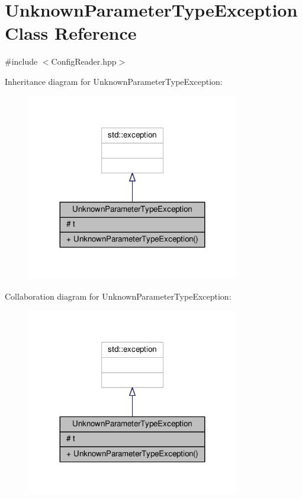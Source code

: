 \hypertarget{class_unknown_parameter_type_exception}{}\section{Unknown\+Parameter\+Type\+Exception Class Reference}
\label{class_unknown_parameter_type_exception}


{\ttfamily \#include $<$Config\+Reader.\+hpp$>$}



Inheritance diagram for Unknown\+Parameter\+Type\+Exception\+:\nopagebreak
\begin{figure}[H]
\begin{center}
\leavevmode
\includegraphics[width=263pt]{class_unknown_parameter_type_exception__inherit__graph}
\end{center}
\end{figure}


Collaboration diagram for Unknown\+Parameter\+Type\+Exception\+:\nopagebreak
\begin{figure}[H]
\begin{center}
\leavevmode
\includegraphics[width=263pt]{class_unknown_parameter_type_exception__coll__graph}
\end{center}
\end{figure}
